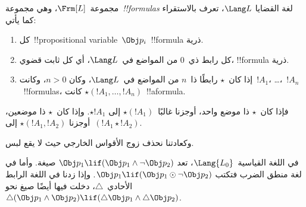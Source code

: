 \documentclass[../../../include/open-logic-section]{subfiles}
\begin{document}


\begin{defn}[الصيغة]
مجموعة~$\Frm[L]$، وهي مجموعة~\emph{!!{formula}s} لغة القضايا
$\Lang L$، تعرف بالاستقراء كما يأتي:
\begin{enumerate}
\item كل~!!{propositional variable}~$\Obj p_i$~!!{formula} ذرية.
\item كل رابط ذي~$0$ من المواضع في~$\Lang L$، أي كل ثابت قضوي،
!!{formula} ذرية.
\item إذا كان~$\star$ رابطًا ذا~$n$ من المواضع في~$\Lang L$، وكان
$n>0$، وكانت~$!A_1$، \dots،~$!A_n$~!!{formula}s، كانت
$\star(!A_1, \dots, !A_n)$~!!a{formula}.
\end{enumerate}
فإذا كان~$\star$ ذا موضع واحد، أوجزنا غالبًا~$\star(!A_1)$ إلى
$\star !A_1$. وإذا كان~$\star$ ذا موضعين، أوجزنا
$\star(!A_1,!A_2)$ إلى~$(!A_1 \star !A_2)$.
\end{defn}

وكعادتنا نحذف زوج الأقواس الخارجي حيث لا يقع لبس.

\begin{ex}
  في اللغة القياسية~$\Lang{L_0}$، تعد
  $\Obj p_1 \lif (\Obj p_1 \land \lnot \Obj p_2)$ صيغة.
  وأما في لغة منطق الضرب فتكتب
  $\Obj p_1 \lif (\Obj p_1 \odot \lnot \Obj p_2)$.
  وإذا زدنا في اللغة الرابط الأحادي~$\triangle$، دخلت فيها أيضًا
  صيغ نحو~$\triangle (\Obj p_1 \land \Obj p_2) \lif
  (\triangle \Obj p_1 \land \triangle \Obj p_2)$.
\end{ex}
\end{document}
